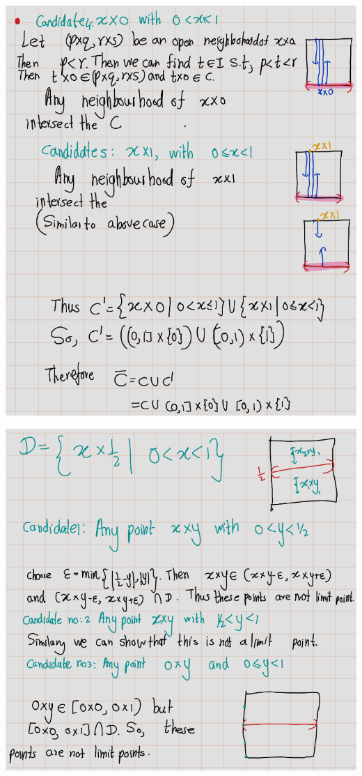 \documentclass[
]{book}
\theoremstyle{definition}
\theoremstyle{definition}
\theoremstyle{definition}
\theoremstyle{definition}
\theoremstyle{remark}
\begin{document}
\includegraphics{figures/Exercises/Ex 2.17/ex-18-5.png}

\includegraphics{figures/Exercises/Ex 2.17/ex-18-6.png}
\end{document}
